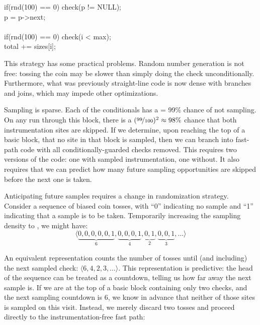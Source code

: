 \begin{code}
  if(rnd(100) == 0) check(p != NULL); \\
  \up p = p->next; \\
  \\
  if(rnd(100) == 0) check(i < max); \\
  \up total += sizes[i];
\end{code}

This strategy has some practical problems.  Random number generation
is not free: tossing the coin may be slower than simply doing the
check unconditionally.  Furthermore, what was previously straight-line
code is now dense with branches and joins, which may impede other
optimizations.

Sampling is sparse.  Each of the conditionals has a 
= 99\% chance of not sampling.  On any run through this block, there
is a $(\nicefrac{99}{100})^2 \approx 98\%$ chance that both
instrumentation sites are skipped.  If we determine, upon reaching the
top of a basic block, that no site in that block is sampled, then we
can branch into fast-path code with all conditionally-guarded checks
removed.  This requires two versions of the code: one with sampled
instrumentation, one without.  It also requires that we can predict
how many future sampling opportunities are skipped before the next one
is taken.

Anticipating future samples requires a change in randomization
strategy.  Consider a sequence of biased coin tosses, with ``0''
indicating no sample and ``1'' indicating that a sample is to be
taken.  Temporarily increasing the sampling density to
, we might have:
\begin{equation*}
  \langle
  \underbrace{0, 0, 0, 0, 0, 1}_6,
  \underbrace{0, 0, 0, 1}_4,
  \underbrace{0, 1}_2,
  \underbrace{0, 0, 1}_3,
  \dots
  \rangle
\end{equation*}

An equivalent representation counts the number of tosses until (and
including) the next sampled check: $\langle6, 4, 2, 3, \dots \rangle$.
This representation is predictive: the head of the sequence can be
treated as a countdown, telling us how far away the next sample is.
If we are at the top of a basic block containing only two checks, and
the next sampling countdown is 6, we know in advance that neither of
those sites is sampled on this visit.  Instead, we merely discard two
tosses and proceed directly to the instrumentation-free fast path:

